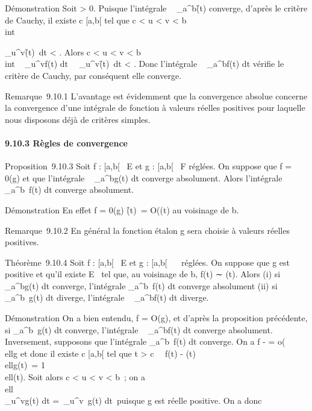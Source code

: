 \documentclass[]{article}
\begin{document}
Démonstration Soit \epsilon > 0. Puisque l'intégrale
\int ~
_a^b\f(t)\dt
converge, d'après le critère de Cauchy, il existe c \in [a,b[ tel que
c < u < v < b \rigtharrow~\\int

_u^v\f(t)\
dt < \epsilon. Alors c < u < v < b
\rigtharrow~\\int ~
_u^vf(t) dt\
\leq\int ~
_u^v\f(t)\
dt < \epsilon. Donc l'intégrale \int ~
_a^bf(t) dt vérifie le critère de Cauchy, par conséquent
elle converge.

Remarque~9.10.1 L'avantage est évidemment que la convergence absolue
concerne la convergence d'une intégrale de fonction à valeurs réelles
positives pour laquelle nous disposons déjà de critères simples.

\paragraph{9.10.3 Règles de convergence}

Proposition~9.10.3 Soit f : [a,b[\rightarrow~ E et g : [a,b[\rightarrow~ F réglées. On
suppose que f = 0(g) et que l'intégrale \int ~
_a^bg(t) dt converge absolument. Alors l'intégrale
\int  _a^b~f(t) dt converge
absolument.

Démonstration En effet f = 0(g) \Leftrightarrow
\f(t)\ =
O(\g(t)\) au voisinage
de b.

Remarque~9.10.2 En général la fonction étalon g sera choisie à valeurs
réelles positives.

Théorème~9.10.4 Soit f : [a,b[\rightarrow~ E et g : [a,b[\rightarrow~ ~ réglées. On
suppose que g est positive et qu'il existe \ell \in E
\diagdown\0\ tel que, au voisinage de b, f(t)
∼ \ellg(t). Alors (i) si \int ~
_a^bg(t) dt converge, l'intégrale
\int  _a^b~f(t) dt converge
absolument (ii) si \int  _a^b~g(t)
dt diverge, l'intégrale \int ~
_a^bf(t) dt diverge.

Démonstration On a bien entendu, f = O(g), et d'après la proposition
précédente, si \int  _a^b~g(t) dt
converge, l'intégrale \int ~
_a^bf(t) dt converge absolument. Inversement, supposons
que l'intégrale \int  _a^b~f(t) dt
converge. On a f - \ellg =
o(\\ellg\) et donc il
existe c \in [a,b[ tel que t > c
\rigtharrow~\ f(t) - \ellg(t)\ 
\\ellg(t)\ = 1
\over 2
\\ell\g(t). Soit alors c
< u < v < b~; on a
\\ell\\\int
 _u^vg(t) dt =\
\ell\int  _u^v~g(t)
dt\ puisque g est réelle positive. On a donc
\end{document}
